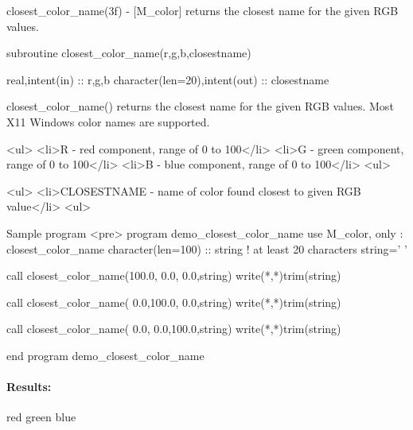\begin{DoxyDescription}
\item[\label{_CLOSEST_COLOR_NAME}%
N\+A\+ME ]closest\+\_\+color\+\_\+name(3f) -\/ \mbox{[}M\+\_\+color\mbox{]} returns the closest name for the given R\+GB values. 


\item[S\+Y\+N\+O\+P\+S\+IS ]
\begin{DoxyPre}
    subroutine closest\_color\_name(r,g,b,closestname)\end{DoxyPre}



\begin{DoxyPre}     real,intent(in)               :: r,g,b
     character(len=20),intent(out) :: closestname
    \end{DoxyPre}
 


\item[D\+E\+S\+C\+R\+I\+P\+T\+I\+ON ]\begin{DoxyVerb}closest_color_name() returns the closest name for the given RGB values.
Most X11 Windows color names are supported.
\end{DoxyVerb}
 


\item[O\+P\+T\+I\+O\+NS ]\begin{DoxyVerb}<ul>
<li>R  - red component, range of 0 to 100</li>
<li>G  - green component, range of 0 to 100</li>
<li>B  - blue component, range of 0 to 100</li>
<ul>
\end{DoxyVerb}
 


\item[R\+E\+T\+U\+R\+NS ]\begin{DoxyVerb}<ul>
<li>CLOSESTNAME  - name of color found closest to given RGB value</li>
<ul>
\end{DoxyVerb}
 


\item[E\+X\+A\+M\+P\+LE ]\begin{DoxyVerb}Sample program
<pre>
   program demo_closest_color_name
   use M_color, only : closest_color_name
   character(len=100) :: string ! at least 20 characters
   string=' '

   call closest_color_name(100.0,  0.0,  0.0,string)
   write(*,*)trim(string)

   call closest_color_name(  0.0,100.0,  0.0,string)
   write(*,*)trim(string)

   call closest_color_name(  0.0,  0.0,100.0,string)
   write(*,*)trim(string)

   end program demo_closest_color_name
\end{DoxyVerb}


\paragraph*{Results\+:}

red green blue 




\end{DoxyDescription}

